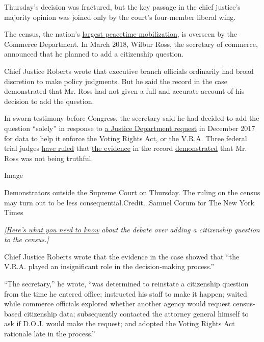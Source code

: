 Thursday's decision was fractured, but the key passage in the chief
justice's majority opinion was joined only by the court's four-member
liberal wing.

The census, the nation's
\href{https://www.oig.doc.gov/OIGPublications/OIG-11-030-I.pdf}{largest
peacetime mobilization}, is overseen by the Commerce Department. In
March 2018, Wilbur Ross, the secretary of commerce, announced that he
planned to add a citizenship question.

Chief Justice Roberts wrote that executive branch officials ordinarily
had broad discretion to make policy judgments. But he said the record in
the case demonstrated that Mr. Ross had not given a full and accurate
account of his decision to add the question.

In sworn testimony before Congress, the secretary said he had decided to
add the question ``solely'' in response to
\href{https://www.documentcloud.org/documents/4340651-Text-of-Dec-2017-DOJ-letter-to-Census.html}{a
Justice Department request} in December 2017 for data to help it enforce
the Voting Rights Act, or the V.R.A. Three federal trial judges
\href{https://www.brennancenter.org/sites/default/files/legal-work/2019-01-15-574-Findings\%20Of\%20Fact.pdf}{have
ruled} that
\href{https://www.brennancenter.org/sites/default/files/legal-work/Order_3\%3A6\%3A19.pdf}{the
evidence} in the record
\href{https://www.brennancenter.org/sites/default/files/legal-work/FindingsofFact_\%202019-04-05.pdf}{demonstrated}
that Mr. Ross was not being truthful.

Image

Demonstrators outside the Supreme Court on Thursday. The ruling on the
census may turn out to be less consequential.Credit...Samuel Corum for
The New York Times

\emph{{[}}\href{https://www.nytimes3xbfgragh.onion/2019/06/27/us/census-question-citizenship.html?action=click\&module=Intentional\&pgtype=Article}{\emph{Here's
what you need to know}} \emph{about the debate over adding a citizenship
question to the census.{]}}

Chief Justice Roberts wrote that the evidence in the case showed that
``the V.R.A. played an insignificant role in the decision-making
process.''

``The secretary,'' he wrote, ``was determined to reinstate a citizenship
question from the time he entered office; instructed his staff to make
it happen; waited while commerce officials explored whether another
agency would request census-based citizenship data; subsequently
contacted the attorney general himself to ask if D.O.J. would make the
request; and adopted the Voting Rights Act rationale late in the
process.''

